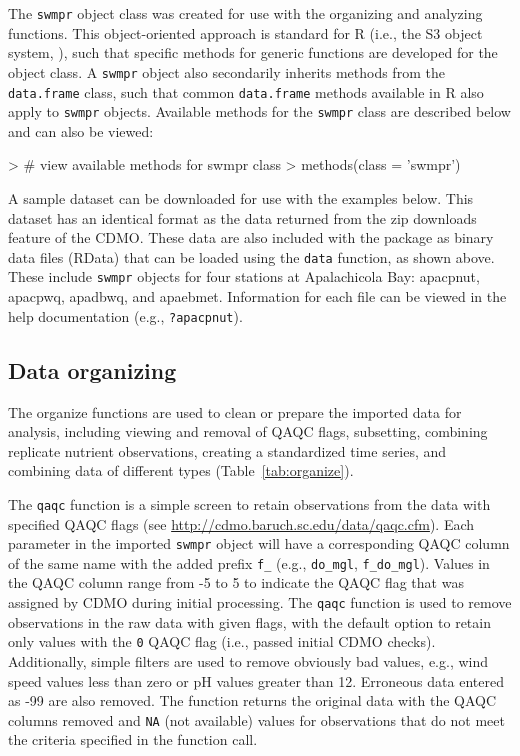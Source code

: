 The \texttt{swmpr} object class was created for use with the organizing and analyzing functions.  This object-oriented approach is standard for R (i.e., the S3 object  system, \cite{Wickham14}), such that specific methods for generic functions are developed for the object class.  A \texttt{swmpr} object also secondarily inherits methods from the \texttt{data.frame} class, such that common \texttt{data.frame} methods available in R also apply to \texttt{swmpr} objects.  Available methods for the \texttt{swmpr} class are described below and can also be viewed:
 
\begin{example}
> # view available methods for swmpr class
> methods(class = 'swmpr')
\end{example}

A sample dataset can be downloaded for use with the examples below.  This dataset has an identical format as the data returned from the zip downloads feature of the CDMO.  These data are also included with the package as binary data files (RData) that can be loaded using the \texttt{data} function, as shown above.  These include \texttt{swmpr} objects for four stations at Apalachicola Bay: apacpnut, apacpwq, apadbwq, and apaebmet.  Information for each file can be viewed in the help documentation (e.g., \texttt{?apacpnut}).

\subsection{Data organizing}

The organize functions are used to clean or prepare the imported data for analysis, including viewing and removal of QAQC flags, subsetting, combining replicate nutrient observations, creating a standardized time series, and combining data of different types (Table~\ref{tab:organize}).

The \texttt{qaqc} function is a simple screen to retain observations from the data with specified QAQC flags (see \url{http://cdmo.baruch.sc.edu/data/qaqc.cfm}). Each parameter in the imported \texttt{swmpr} object will have a corresponding QAQC column of the same name with the added prefix \texttt{f\_} (e.g., \texttt{do\_mgl}, \texttt{f\_do\_mgl}).  Values in the QAQC column range from -5 to 5 to indicate the QAQC flag that was assigned by CDMO during initial processing.  The \texttt{qaqc} function is used to remove observations in the raw data with given flags, with the default option to retain only values with the \texttt{0} QAQC flag (i.e., passed initial CDMO checks).     Additionally, simple filters are used to remove obviously bad values, e.g., wind speed values less than zero or pH values greater than 12. Erroneous data entered as -99 are also removed. The function returns the original data with the QAQC columns removed and \texttt{NA} (not available) values for observations that do not meet the criteria specified in the function call.

